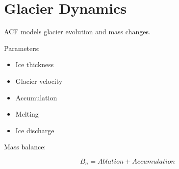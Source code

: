\section{Glacier Dynamics}


ACF models glacier evolution and mass changes.



Parameters:


\begin{itemize}

\item Ice thickness

\item Glacier velocity

\item Accumulation

\item Melting

\item Ice discharge

\end{itemize}



Mass balance:


\[
B_n=Ablation+Accumulation
\]
